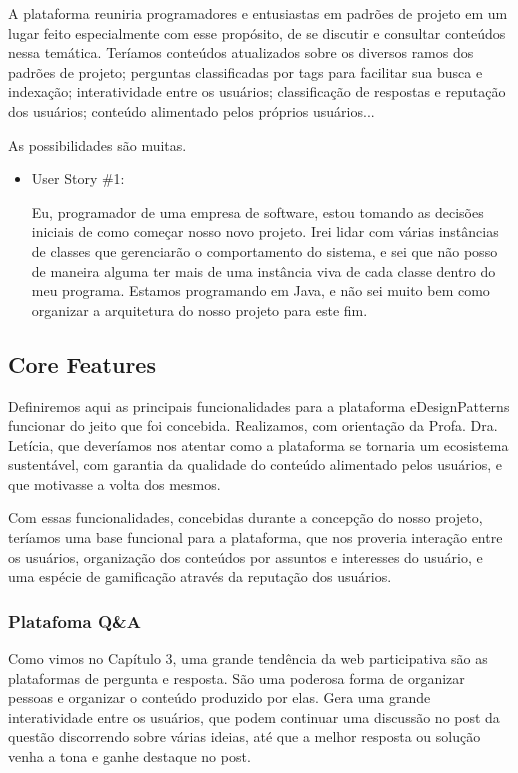 A plataforma reuniria programadores e entusiastas em padrões de projeto em um lugar feito especialmente com esse propósito, de se discutir e consultar conteúdos nessa temática. Teríamos conteúdos atualizados sobre os diversos ramos dos padrões de projeto; perguntas classificadas por tags para facilitar sua busca e indexação; interatividade entre os usuários; classificação de respostas e reputação dos usuários; conteúdo alimentado pelos próprios usuários...

As possibilidades são muitas.

\begin{itemize}
	\item User Story \#1: 

	Eu, programador de uma empresa de software, estou tomando as decisões iniciais de como começar nosso novo projeto. Irei lidar com várias instâncias de classes que gerenciarão o comportamento do sistema, e sei que não posso de maneira alguma ter mais de uma instância viva de cada classe dentro do meu programa. Estamos programando em Java, e não sei muito bem como organizar a arquitetura do nosso projeto para este fim.
\end{itemize}



\subsection{Core Features}

Definiremos aqui as principais funcionalidades para a plataforma eDesignPatterns funcionar do jeito que foi concebida. Realizamos, com orientação da Profa. Dra. Letícia, que deveríamos nos atentar como a plataforma se tornaria um ecosistema sustentável, com garantia da qualidade do conteúdo alimentado pelos usuários, e que motivasse a volta dos mesmos.

Com essas funcionalidades, concebidas durante a concepção do nosso projeto, teríamos uma base funcional para a plataforma, que nos proveria interação entre os usuários, organização dos conteúdos por assuntos e interesses do usuário, e uma espécie de gamificação através da reputação dos usuários.

\subsubsection{Platafoma Q\&A}
Como vimos no Capítulo 3, uma grande tendência da web participativa são as  plataformas de pergunta e resposta. São uma poderosa forma de organizar pessoas e organizar o conteúdo produzido por elas. Gera uma grande interatividade entre os usuários, que podem continuar uma discussão no post da questão discorrendo sobre várias ideias, até que a melhor resposta ou solução venha a tona e ganhe destaque no post.
